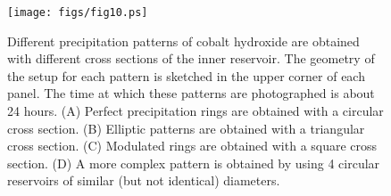 \documentclass[aps,preprint]{revtex4}
\begin{document}
\begin{figure}[htb]
\centering
\texttt{[image: figs/fig10.ps]}
\caption{Different precipitation patterns of cobalt hydroxide are obtained
with different cross sections of the inner reservoir. The geometry of the
setup for each pattern is sketched in the upper corner of each panel. The time
at which these patterns are photographed is about 24 hours. (A) Perfect
precipitation rings are obtained with a circular cross section. (B) Elliptic
patterns are obtained with a triangular cross section. (C) Modulated rings are
obtained with a square cross section. (D) A more complex pattern is obtained
by using 4 circular reservoirs of similar (but not identical) diameters.}
\label{fig:experiment}
\end{figure}
\end{document}

